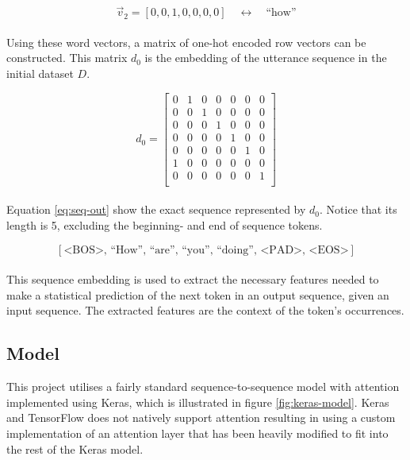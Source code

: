 \documentclass{article}
\begin{document}
$$
  \vec{v}_2 = [0, 0, 1, 0, 0, 0, 0] \quad {\leftrightarrow} \quad \textrm{``how''}
$$

\paragraph{}
Using these word vectors, a matrix of one-hot encoded row vectors can be
constructed. This matrix $d_0$ is the embedding of the utterance sequence
in the initial dataset $D$.  

$$
  d_{0} = 
    \begin{bmatrix}
      0 & 1 & 0 & 0 & 0 & 0 & 0\\
      0 & 0 & 1 & 0 & 0 & 0 & 0\\
      0 & 0 & 0 & 1 & 0 & 0 & 0\\
      0 & 0 & 0 & 0 & 1 & 0 & 0\\
      0 & 0 & 0 & 0 & 0 & 1 & 0\\
      1 & 0 & 0 & 0 & 0 & 0 & 0\\
      0 & 0 & 0 & 0 & 0 & 0 & 1\\
    \end{bmatrix}
$$

\paragraph{}
Equation \ref{eq:seq-out} show the exact sequence represented by $d_0$. Notice
that its length is 5, excluding the beginning- and end of sequence tokens.

\begin{equation} \label{eq:seq-out}
  [ \textrm{<BOS>},\, \textrm{``How''},\, \textrm{``are''},\, \textrm{``you''},\,
    \textrm{``doing''},\, \textrm{<PAD>},\, \textrm{<EOS>} ]
\end{equation}

\paragraph{}
This sequence embedding is used to extract the necessary features needed to
make a statistical prediction of the next token in an output sequence, given an
input sequence. The extracted features are the context of the token's
occurrences.

\subsection*{Model}
This project utilises a fairly standard sequence-to-sequence model with
attention implemented using Keras, which is illustrated in figure
\ref{fig:keras-model}. Keras and TensorFlow does not natively support
attention resulting in using a custom implementation of an attention layer
\cite{keras-attention} that has been heavily modified to fit into the rest of
the Keras model.  
\end{document}
